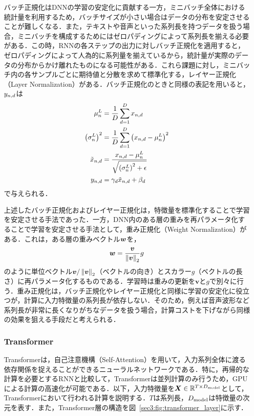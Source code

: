 バッチ正規化はDNNの学習の安定化に貢献する一方，ミニバッチ全体における統計量を利用するため，バッチサイズが小さい場合はデータの分布を安定させることが難しくなる．また，テキストや音声といった系列長を持つデータを扱う場合，ミニバッチを構成するためにはゼロパディングによって系列長を揃える必要がある．この時，RNNの各ステップの出力に対しバッチ正規化を適用すると，ゼロパディングによって人為的に系列量を揃えているから，統計量が実際のデータの分布からかけ離れたものになる可能性がある．これら課題に対し，ミニバッチ内の各サンプルごとに期待値と分散を求めて標準化する，レイヤー正規化（Layer Normalization）\cite{ba2016layer}がある．バッチ正規化のときと同様の表記を用いると，$y_{n, d}$は
\begin{align}
    \mu^{L}_{n}                      & = \frac{1}{D} \sum_{d = 1}^{D} x_{n, d}                                  \\
    \left(\sigma^{L}_{n}\right)^{2}              & = \frac{1}{D} \sum_{d = 1}^{D} \left(x_{n, d} - \mu^{L}_{n}\right)^{2} \\
    \tilde{x}_{n, d} & = \frac{x_{n, d} - \mu^{L}_{n}}{\sqrt{\left(\sigma^{L}_{n}\right)^{2} + \epsilon}}       \\
    y_{n, d}        & = \gamma_{d} \tilde{x}_{n, d} +  \beta_{d}
\end{align}
で与えられる．

上述したバッチ正規化およびレイヤー正規化は，特徴量を標準化することで学習を安定させる手法であった．一方，DNN内のある層の重みを再パラメータ化することで学習を安定させる手法として，重み正規化（Weight Normalization）\cite{salimans2016weight}がある．これは，ある層の重みベクトル$\bm{w}$を，
\begin{equation}
    \bm{w} = \frac{\bm{v}}{\left\|\bm{v}\right\|_{2}} g
\end{equation}
のように単位ベクトル$\bm{v} / \left\|\bm{v}\right\|_{2}$（ベクトルの向き）とスカラー$g$（ベクトルの長さ）に再パラメータ化するものである．学習時は重みの更新を$\bm{v}$と$g$で別々に行う．重み正規化は，バッチ正規化やレイヤー正規化と同様に学習の安定化に役立つが，計算に入力特徴量の系列長が依存しない．そのため，例えば音声波形など系列長が非常に長くなりがちなデータを扱う場合，計算コストを下げながら同様の効果を狙える手段だと考えられる．

\subsubsection{Transformer}
Transformer\cite{vaswani2017attention}は，自己注意機構（Self-Attention）を用いて，入力系列全体に渡る依存関係を捉えることができるニューラルネットワークである．特に，再帰的な計算を必要とするRNNと比較して，Transformerは並列計算のみ行うため，GPUによる計算の高速化が可能である．以下，入力特徴量を$\bm{X} \in \mathbb{R}^{T \times D_{\text{model}}}$として，Transformerにおいて行われる計算を説明する．$T$は系列長，$D_{\text{model}}$は特徴量の次元を表す．また，Transformer層の構造を図~\ref{sec3:fig:transformer_layer}に示す．

